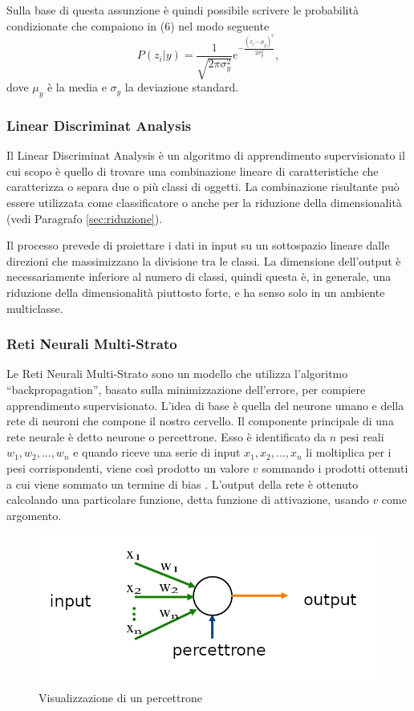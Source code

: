 \documentclass[12pt,italian]{report}
\begin{document}
Sulla base di questa assunzione è quindi possibile scrivere le probabilità condizionate che compaiono in (6) nel modo seguente
\begin{equation}
P(z_i|y) = \frac{1}{\sqrt{2\pi \sigma_y^2}} e^{-\frac{(z_i-\mu_y)^2}{2\sigma_y^2}},
\end{equation}
dove $\mu_y$ è la media e $\sigma_y$ la deviazione standard.
\subsubsection{Linear Discriminat Analysis}
Il Linear Discriminat Analysis è un algoritmo di apprendimento supervisionato il cui scopo è quello di trovare una combinazione lineare di caratteristiche che caratterizza o separa due o più classi di oggetti. La combinazione risultante può essere utilizzata come classificatore o anche per la riduzione della dimensionalità (vedi Paragrafo \ref{sec:riduzione}).

Il processo prevede di proiettare i dati in input su un sottospazio lineare dalle direzioni che massimizzano la divisione tra le classi. La dimensione dell'output è necessariamente inferiore al numero di classi, quindi questa è, in generale, una riduzione della dimensionalità piuttosto forte, e ha senso solo in un ambiente multiclasse.

\subsubsection{Reti Neurali Multi-Strato}
\label{MLP}
Le Reti Neurali Multi-Strato sono un modello che utilizza l'algoritmo ``backpropagation'', basato sulla minimizzazione dell'errore, per compiere apprendimento supervisionato. L'idea di base è quella del neurone umano e della rete di neuroni che compone il nostro cervello. Il componente principale di una rete neurale è detto neurone o percettrone. Esso è identificato da $n$ pesi reali $w_1, w_2,...,w_n$ e quando riceve una serie di input $x_1,x_2,...,x_n$ li moltiplica per i pesi corrispondenti, viene così prodotto un valore $v$ sommando i prodotti ottenuti a cui viene sommato un termine di bias \cite{multilayerPerceptron}.  L'output della rete è ottenuto calcolando una particolare funzione, detta funzione di attivazione, usando $v$ come argomento.

\begin{figure}[h]
	\centering
	\includegraphics[width = 120mm]{immagini/Perceptron}
	\caption{Visualizzazione di un percettrone}
\end{figure}
\end{document}
